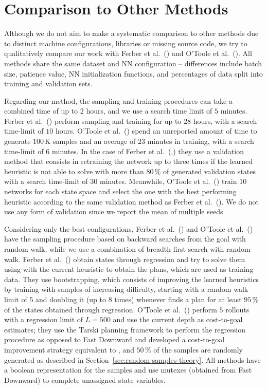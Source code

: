 \chapter{Comparison to Other Methods}
\label{sec:comparison}

Although we do not aim to make a systematic comparison to other methods due to distinct machine configurations, libraries or missing source code, we try to qualitatively compare our work with Ferber et al.~(\citeyear{Ferber.etal/2022}) and O'Toole et al.~(\citeyear{OToole/2022}). All methods share the same dataset and NN configuration -- differences include batch size, patience value, NN initialization functions, and percentages of data split into training and validation sets.

Regarding our method, the sampling and training procedures can take a combined time of up to $2$ hours, and we use a search time limit of $5$ minutes. Ferber et al.~(\citeyear{Ferber.etal/2022}) perform sampling and training for up to $28$ hours, with a search time-limit of $10$ hours. O'Toole et al.~(\citeyear{OToole/2022}) spend an unreported amount of time to generate $100$\,K samples and an average of $23$ minutes in training, with a search time-limit of $6$ minutes. In the case of Ferber et al.~(\citeyear{Ferber.etal/2022},) they use a validation method that consists in retraining the network up to three times if the learned heuristic is not able to solve with \gbfs more than $80\,\%$ of generated validation states with a search time-limit of $30$ minutes. Meanwhile, O'Toole et al.~(\citeyear{OToole/2022}) train $10$ networks for each state space and select the one with the best performing heuristic according to the same validation method as Ferber et al.~(\citeyear{Ferber.etal/2022}). We do not use any form of validation since we report the mean of multiple seeds.

Considering only the best configurations, Ferber et al.~(\citeyear{Ferber.etal/2022}) and O'Toole et al.~(\citeyear{OToole/2022}) have the sampling procedure based on backward searches from the goal with random walk, while we use a combination of breadth-first search with random walk. Ferber et al.~(\citeyear{Ferber.etal/2022}) obtain states through regression and try to solve them using \gbfs with the current heuristic to obtain the plans, which are used as training data. They use bootstrapping, which consists of improving the learned heuristics by training with samples of increasing difficulty, starting with a random walk limit of $5$ and doubling it (up to $8$ times) whenever \gbfs finds a plan for at least $95\,\%$ of the states obtained through regression. O'Toole et al.~(\citeyear{OToole/2022}) perform $5$ rollouts with a regression limit of $L=500$ and use the current depth as cost-to-goal estimates; they use the Tarski planning framework to perform the regression procedure as opposed to Fast Downward and developed a cost-to-goal improvement strategy equivalent to \hmin, and $50\,\%$ of the samples are randomly generated as described in Section~\ref{sec:random-samples-theory}. All methods have a boolean representation for the samples and use mutexes (obtained from Fast Downward) to complete unassigned state variables.

